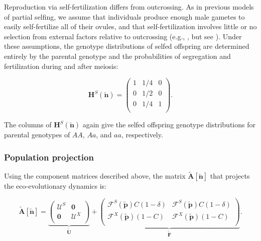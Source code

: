 \documentclass[11pt]{article}
\def\mbf#1{\mathbf{#1}}
\def\mcal#1{\mathcal{#1}}
\begin{document}
Reproduction via self-fertilization differs from outcrossing. As in previous models of partial selfing, we assume that individuals produce enough male gametes to easily self-fertilize all of their ovules, and that self-fertilization involves little or no selection from external factors relative to outcrossing (e.g., \citealt{Charlesworth1978a,JordanConnallon2014,Olito2017}, but see \citealt{Tazzyman2015}). Under these assumptions, the genotype distributions of selfed offspring are determined entirely by the parental genotype and the probabilities of segregation and fertilization during and after meiosis: 
\begin{linenomath*}
\begin{equation} \label{eq:HS}
	\mbf{H}^S(\tilde{\mbf{n}}) = 
			\left(
			\begin{array}{ccc}
				1 & 1/4 & 0 \\
				0 & 1/2 & 0 \\
				0 & 1/4 & 1 \\
			\end{array} \right).
\end{equation}
\end{linenomath*}

\noindent The columns of $\mbf{H}^S(\tilde{\mbf{n}})$ again give the selfed offspring genotype distributions for parental genotypes of $AA$, $Aa$, and $aa$, respectively.


\subsubsection*{Population projection}

Using the component matrices described above, the matrix $\tilde{\mbf{A}}[\tilde{\mbf{n}}]$ that projects the eco-evolutionary dynamics is:
\begin{linenomath*}
\begin{equation} \label{eq:Atilde}
	\tilde{\mbf{A}}[\tilde{\mbf{n}}] = 
			\underbrace{\left(
			\begin{array}{c|c}
				\mcal{U}^S & \mbf{0} \\ \hline
				\mbf{0} & \mcal{U}^X \\
			\end{array} \right)}_{\tilde{\mbf{U}}} + 
			\underbrace{\left(
			\begin{array}{c|c}
				\mcal{F}^S(\tilde{\mbf{p}}) C(1 - \delta) & \mcal{F}^S(\tilde{\mbf{p}}) C(1 - \delta) \\ \hline
				\mcal{F}^X(\tilde{\mbf{p}}) (1 - C) & \mcal{F}^X(\tilde{\mbf{p}}) (1 - C)\\
			\end{array} \right)}_{\tilde{\mbf{F}}}.
\end{equation}
\end{linenomath*}
\end{document}
